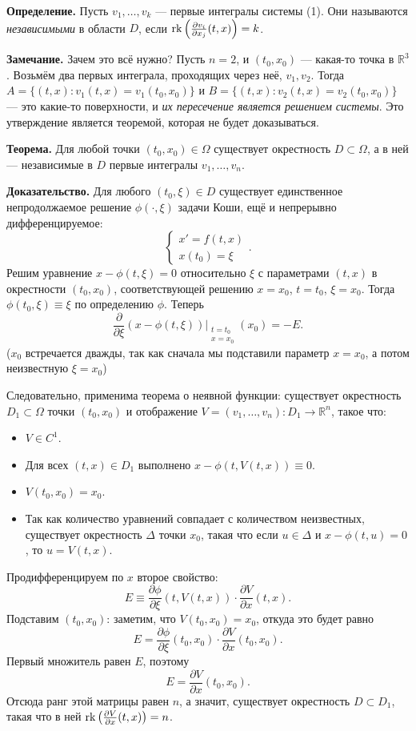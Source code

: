 \QED

\textbf{Определение.} Пусть $v_1, \dots, v_k$ --- первые интегралы системы (1).
Они называются \textit{независимыми} в области $D$, если $\operatorname{rk} \left( \frac{\partial v_i}{\partial x_j}(t, x) \right) = k$.

\textbf{Замечание.} Зачем это всё нужно? Пусть $n = 2$, и $(t_0, x_0)$ --- какая-то точка в $\mathbb R^3$.
Возьмём два первых интеграла, проходящих через неё, $v_1, v_2$.
Тогда $A = \{(t, x): v_1(t, x) = v_1(t_0, x_0)\}$ и $B = \{(t, x): v_2(t, x) = v_2(t_0, x_0)\}$ --- это какие-то поверхности, и \textit{их пересечение является решением системы}.
Это утверждение является теоремой, которая не будет доказываться.

\textbf{Теорема.} Для любой точки $(t_0, x_0) \in \Omega$ существует окрестность $D \subset \Omega$, а в ней --- независимые в $D$ первые интегралы $v_1, \dots, v_n$.

\textbf{Доказательство.} Для любого $(t_0, \xi) \in D$ существует единственное непродолжаемое решение $\phi(\cdot, \xi)$ задачи Коши, ещё и непрерывно дифференцируемое:
\[
    \begin{cases}
        x' = f(t, x) \\
        x(t_0) = \xi 
    \end{cases} .
\]
Решим уравнение $x - \phi(t, \xi) = 0$ относительно $\xi$ с параметрами $(t, x)$ в окрестности $(t_0, x_0)$, соответствующей решению $x = x_0$, $t = t_0$, $\xi = x_0$.
Тогда $\phi(t_0, \xi) \equiv \xi$ по определению $\phi$.
Теперь
\[
    \frac{\partial}{\partial \xi} (x - \phi(t, \xi)) \bigg|_{\substack{t = t_0 \\ x = x_0}}(x_0) = -E.
\]
($x_0$ встречается дважды, так как сначала мы подставили параметр $x = x_0$, а потом неизвестную $\xi = x_0$)

Следовательно, применима теорема о неявной функции: существует окрестность $D_1 \subset \Omega$ точки $(t_0, x_0)$ и отображение $V = (v_1, \dots, v_n): D_1 \to \mathbb R^n$, такое что:
\begin{itemize}
    \item $V \in C^1$.
    \item Для всех $(t, x) \in D_1$ выполнено $x - \phi(t, V(t, x)) \equiv 0$.
    \item $V(t_0, x_0) = x_0$.
    \item Так как количество уравнений совпадает с количеством неизвестных, существует окрестность $\Delta$ точки $x_0$, такая что если $u \in \Delta$ и $x - \phi(t, u) = 0$, то $u = V(t, x)$.
\end{itemize}
Продифференцируем по $x$ второе свойство:
\[
    E \equiv \frac{\partial \phi}{\partial \xi}(t, V(t, x)) \cdot \frac{\partial V}{\partial x}(t, x).
\]
Подставим $(t_0, x_0)$: заметим, что $V(t_0, x_0) = x_0$, откуда это будет равно
\[
    E = \frac{\partial \phi}{\partial \xi}(t_0, x_0) \cdot \frac{\partial V}{\partial x}(t_0, x_0).
\]
Первый множитель равен $E$, поэтому
\[
    E = \frac{\partial V}{\partial x}(t_0, x_0).
\]
Отсюда ранг этой матрицы равен $n$, а значит, существует окрестность $D \subset D_1$, такая что в ней $\operatorname{rk} \left( \frac{\partial V}{\partial x} (t, x) \right) = n$.

